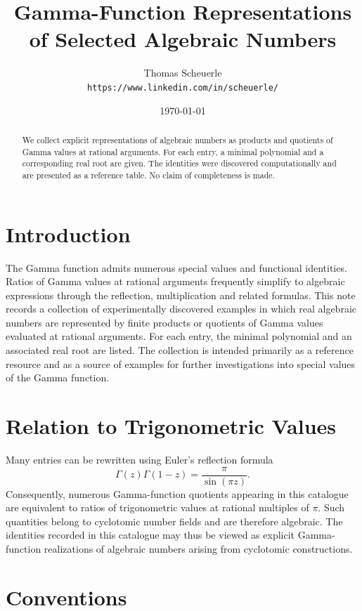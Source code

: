 \documentclass[11pt,a4paper]{article}
\title{Gamma-Function Representations of Selected Algebraic Numbers}
\author{Thomas Scheuerle \\ \texttt{https://www.linkedin.com/in/scheuerle/}}
\date{\today}
\begin{document}
\maketitle

\begin{abstract}
We collect explicit representations of algebraic numbers as products and quotients of Gamma values at rational arguments.
For each entry, a minimal polynomial and a corresponding real root are given.
The identities were discovered computationally and are presented as a reference table. No claim of completeness is made.
\end{abstract}

\section{Introduction}

The Gamma function admits numerous special values and functional identities. Ratios of Gamma values at rational arguments frequently simplify to algebraic expressions through the reflection, multiplication and related formulas. This note records a collection of experimentally discovered examples in which real algebraic numbers are represented by finite products or quotients of Gamma values evaluated at rational arguments.
For each entry, the minimal polynomial and an associated real root are listed. The collection is intended primarily as a reference resource and as a source of examples for further investigations into special values of the Gamma function.

\section*{Relation to Trigonometric Values}

Many entries can be rewritten using Euler's reflection formula \[ \Gamma(z)\Gamma(1-z) = \frac{\pi}{\sin(\pi z)}. \] Consequently, numerous Gamma-function quotients appearing in this catalogue are equivalent to ratios of trigonometric values at rational multiples of $\pi$. Such quantities belong to cyclotomic number fields and are therefore algebraic. The identities recorded in this catalogue may thus be viewed as explicit Gamma-function realizations of algebraic numbers arising from cyclotomic constructions.

\section*{Conventions}
\end{document}
